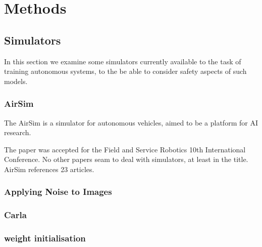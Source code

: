 

\chapter{Methods}
\label{Methods} 

\section{Simulators}

In this section we examine some simulators currently available to the task of training autonomous systems, to the be able to consider safety aspects of such models.

\subsection{AirSim}

The AirSim \cite{airsim2017fsr} is a simulator for autonomous vehicles, aimed to be a platform for AI research.

The paper was accepted for the Field and Service Robotics 10th International Conference. No other papers seam to deal with simulators, at least in the title. AirSim references 23 articles.

\subsection{Applying Noise to Images}

\subsection{Carla}

\subsection{weight initialisation}

